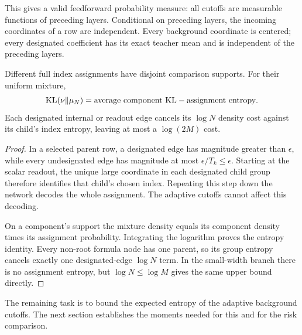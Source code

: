This gives a valid feedforward probability measure: all cutoffs are measurable functions of preceding layers. Conditional on preceding layers, the incoming coordinates of a row are independent. Every background coordinate is centered; every designated coefficient has its exact teacher mean and is independent of the preceding layers.

\begin{lemma}\label{lem:embedding-entropy}
Different full index assignments have disjoint comparison supports. For their uniform mixture,
\[
 \operatorname{KL}(\nu\|\mu_N)
 =\text{average component KL}-\text{assignment entropy}.
\]
Each designated internal or readout edge cancels its $\log N$ density cost against its child's index entropy, leaving at most a $\log(2M)$ cost.
\end{lemma}
\begin{proof}
In a selected parent row, a designated edge has magnitude greater than $\epsilon$, while every undesignated edge has magnitude at most $\epsilon/T_k\le\epsilon$. Starting at the scalar readout, the unique large coordinate in each designated child group therefore identifies that child's chosen index. Repeating this step down the network decodes the whole assignment. The adaptive cutoffs cannot affect this decoding.

On a component's support the mixture density equals its component density times its assignment probability. Integrating the logarithm proves the entropy identity. Every non-root formula node has one parent, so its group entropy cancels exactly one designated-edge $\log N$ term. In the small-width branch there is no assignment entropy, but $\log N\le\log M$ gives the same upper bound directly.
\end{proof}

The remaining task is to bound the expected entropy of the adaptive background cutoffs. The next section establishes the moments needed for this and for the risk comparison.
